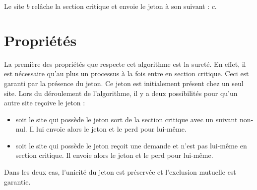 Le site $b$ relâche la section critique et envoie le jeton à son suivant : $c$.
\begin{figure}[H]
\centering
	\caption{\label{naimi-trehel-exemple4}}
\end{figure}


\section{Propriétés}
La première des propriétés que respecte cet algorithme est la sureté. En effet, il est nécessaire qu'au plus un processus à la fois entre en section critique. Ceci est garanti par la présence du jeton. Ce jeton est initialement présent chez un seul site. Lors du déroulement de l'algorithme, il y a deux possibilités pour qu'un autre site reçoive le jeton : 
\begin{itemize}
	\item soit le site qui possède le jeton sort de la section critique avec un suivant non-nul. Il lui envoie alors le jeton et le perd pour lui-même.
	\item soit le site qui possède le jeton reçoit une demande et n'est pas lui-même en section critique. Il envoie alors le jeton et le perd pour lui-même.
\end{itemize}
Dans les deux cas, l'unicité du jeton est préservée et l'exclusion mutuelle est garantie.

